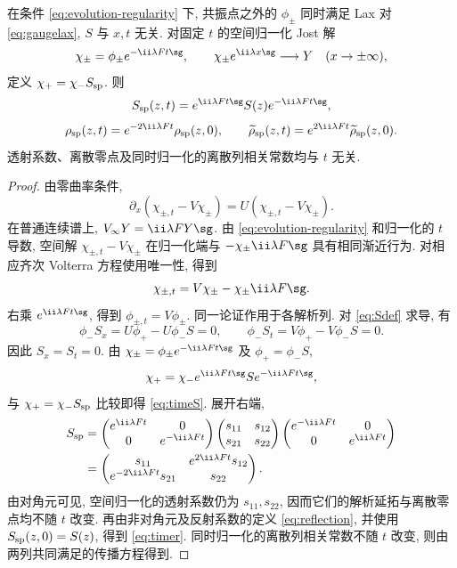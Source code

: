 \begin{proposition}[散射数据的时间演化]\label{prop:evolution}
在条件 \eqref{eq:evolution-regularity} 下, 共振点之外的 $\phi_\pm$ 同时满足 Lax 对 \eqref{eq:gaugelax}, $S$ 与 $x,t$ 无关. 对固定 $t$ 的空间归一化 Jost 解
\[
\chi_\pm=\phi_\pm e^{-\ii\lambda Ft\sg},\qquad
\chi_\pm e^{\ii\lambda x\sg}\longrightarrow Y\quad(x\to\pm\infty),
\]
定义 $\chi_+=\chi_-S_{\rm sp}$. 则
\begin{equation}\label{eq:timeS}
S_{\rm sp}(z,t)=e^{\ii\lambda Ft\sg}S(z)e^{-\ii\lambda Ft\sg},
\end{equation}
\begin{equation}\label{eq:timer}
\rho_{\rm sp}(z,t)=e^{-2\ii\lambda Ft}\rho_{\rm sp}(z,0),\qquad
\widetilde\rho_{\rm sp}(z,t)=e^{2\ii\lambda Ft}\widetilde\rho_{\rm sp}(z,0).
\end{equation}
透射系数、离散零点及同时归一化的离散列相关常数均与 $t$ 无关.
\end{proposition}
\begin{proof}
由零曲率条件,
\[
\partial_x(\chi_{\pm,t}-V\chi_\pm)=U(\chi_{\pm,t}-V\chi_\pm).
\]
在普通连续谱上, $V_\infty Y=\ii\lambda F Y\sg$. 由 \eqref{eq:evolution-regularity} 和归一化的 $t$ 导数, 空间解 $\chi_{\pm,t}-V\chi_\pm$ 在归一化端与 $-\chi_\pm\ii\lambda F\sg$ 具有相同渐近行为. 对相应齐次 Volterra 方程使用唯一性, 得到
\[
\chi_{\pm,t}=V\chi_\pm-\chi_\pm\ii\lambda F\sg.
\]
右乘 $e^{\ii\lambda Ft\sg}$, 得到 $\phi_{\pm,t}=V\phi_\pm$. 同一论证作用于各解析列. 对 \eqref{eq:Sdef} 求导, 有
\[
\phi_-S_x=U\phi_+-U\phi_-S=0,\qquad
\phi_-S_t=V\phi_+-V\phi_-S=0.
\]
因此 $S_x=S_t=0$. 由 $\chi_\pm=\phi_\pm e^{-\ii\lambda Ft\sg}$ 及 $\phi_+=\phi_-S$,
\[
\chi_+=\chi_-e^{\ii\lambda Ft\sg}S e^{-\ii\lambda Ft\sg},
\]
与 $\chi_+=\chi_-S_{\rm sp}$ 比较即得 \eqref{eq:timeS}. 展开右端,
\begin{align*}
S_{\rm sp}
&=\begin{pmatrix}e^{\ii\lambda Ft}&0\\0&e^{-\ii\lambda Ft}\end{pmatrix}
\begin{pmatrix}s_{11}&s_{12}\\s_{21}&s_{22}\end{pmatrix}
\begin{pmatrix}e^{-\ii\lambda Ft}&0\\0&e^{\ii\lambda Ft}\end{pmatrix}\\
&=\begin{pmatrix}
s_{11}&e^{2\ii\lambda Ft}s_{12}\\
e^{-2\ii\lambda Ft}s_{21}&s_{22}
\end{pmatrix}.
\end{align*}
由对角元可见, 空间归一化的透射系数仍为 $s_{11},s_{22}$, 因而它们的解析延拓与离散零点均不随 $t$ 改变. 再由非对角元及反射系数的定义 \eqref{eq:reflection}, 并使用 $S_{\rm sp}(z,0)=S(z)$, 得到 \eqref{eq:timer}. 同时归一化的离散列相关常数不随 $t$ 改变, 则由两列共同满足的传播方程得到.
\end{proof}

